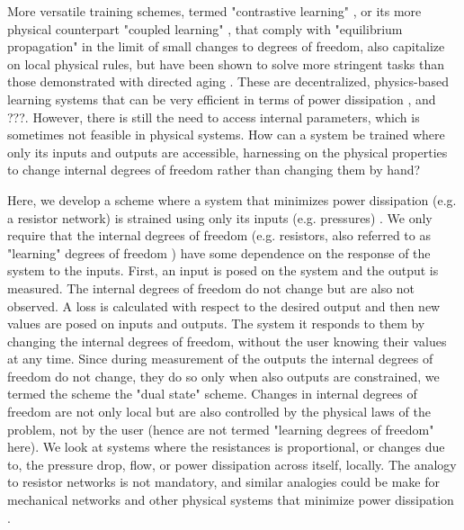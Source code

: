 \documentclass[%
 reprint,
 amsmath,amssymb,
 aps,
]{revtex4-2}
\begin{document}
    More versatile training schemes, termed "contrastive learning" \cite{scellier2017equilibrium}, or its more physical counterpart "coupled learning" \cite{stern2021supervised}, that comply with "equilibrium propagation" \cite{scellier2021deeplearningtheoryneural} in the limit of small changes to degrees of freedom, also capitalize on local physical rules, but have been shown to solve more stringent tasks than those demonstrated with directed aging \cite{dillavou2022demonstration, altman2024experimental}. 
    These are decentralized, physics-based learning systems that can be very efficient in terms of power dissipation \cite{stern2024training}, and \textcolor{roie}{???}. However, there is still the need to access internal parameters, which is sometimes not feasible in physical systems. How can a system be trained where only its inputs and outputs are accessible, harnessing on the physical properties to change internal degrees of freedom rather than changing them by hand?

    Here, we develop a scheme where a system that minimizes power dissipation (e.g. a resistor network) is strained using only its inputs (e.g. pressures) \cite{gold2019self, kedia2019drive}. We only require that the internal degrees of freedom (e.g. resistors, also referred to as "learning" degrees of freedom \cite{dillavou2022demonstration}) have some dependence on the response of the system to the inputs. 
    First, an input is posed on the system and the output is measured. The internal degrees of freedom do not change but are also not observed. 
    A loss is calculated with respect to the desired output and then new values are posed on inputs and outputs. The system it responds to them by changing the internal degrees of freedom, without the user knowing their values at any time. 
    Since during measurement of the outputs the internal degrees of freedom do not change, they do so only when also outputs are constrained, we termed the scheme the "dual state" scheme. 
    Changes in internal degrees of freedom are not only local but are also controlled by the physical laws of the problem, not by the user (hence are not termed "learning degrees of freedom" here). 
    We look at systems where the resistances is proportional, or changes due to, the pressure drop, flow, or power dissipation across itself, locally. 
    The analogy to resistor networks is not mandatory, and similar analogies could be make for mechanical networks and other physical systems that minimize power dissipation \cite{berneman2024designing, marbach2021network}.
\end{document}
